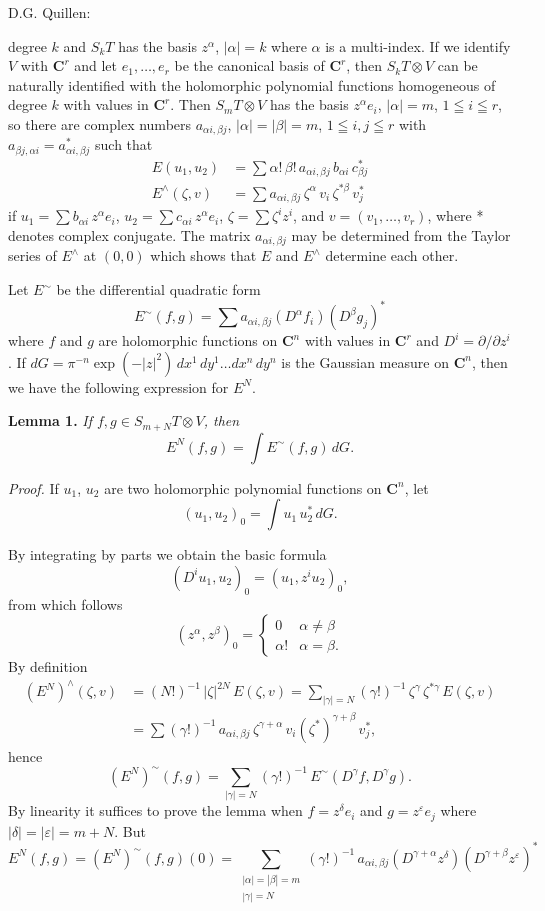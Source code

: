  \hfill D.G. Quillen:

degree $k$ and $S_k T$ has the basis $z^\alpha$, $|\alpha|=k$ where $\alpha$ is a multi-index. If we
identify $V$ with $\mathbf{C}^r$ and let $e_1,\dots,e_r$ be the canonical basis of $\mathbf{C}^r$, then
$S_k T\otimes V$ can be naturally identified with the holomorphic polynomial
functions homogeneous of degree $k$ with values in $\mathbf{C}^r$. Then $S_m T\otimes V$
has the basis $z^\alpha e_i$, $|\alpha|=m$, $1\leqq i\leqq r$, so there are complex numbers $a_{\alpha i,\beta j}$,
$|\alpha|=|\beta|=m$, $1\leqq i, j\leqq r$ with $a_{\beta j,\alpha i}=a^*_{\alpha i,\beta j}$ such that
\[
\begin{aligned}
E(u_1,u_2)&=\sum \alpha!\,\beta!\,a_{\alpha i,\beta j}\,b_{\alpha i}\,c^*_{\beta j}\\
E^\wedge(\zeta,v)&=\sum a_{\alpha i,\beta j}\,\zeta^\alpha\,v_i\,\zeta^{*\beta}\,v^*_j
\end{aligned}
\tag{2}
\]
if $u_1=\sum b_{\alpha i}\,z^\alpha e_i$, $u_2=\sum c_{\alpha i}\,z^\alpha e_i$, $\zeta=\sum \zeta^i z^i$, and $v=(v_1,\dots,v_r)$, where *
denotes complex conjugate. The matrix $a_{\alpha i,\beta j}$ may be determined from
the Taylor series of $E^\wedge$ at $(0,0)$ which shows that $E$ and $E^\wedge$ determine
each other.

Let $E^\sim$ be the differential quadratic form
\[
E^\sim(f,g)=\sum a_{\alpha i,\beta j}(D^\alpha f_i)(D^\beta g_j)^*
\]
where $f$ and $g$ are holomorphic functions on $\mathbf{C}^n$ with values in $\mathbf{C}^r$ and
$D^i=\partial/\partial z^i$. If $dG=\pi^{-n}\exp(-|z|^2)\,dx^1\,dy^1\dots dx^n\,dy^n$ is the Gaussian
measure on $\mathbf{C}^n$, then we have the following expression for $E^N$.

\textbf{Lemma 1.} \textit{If $f,g\in S_{m+N}T\otimes V$, then}
\[
E^N(f,g)=\int E^\sim(f,g)\,dG.
\]

\textit{Proof.} If $u_1$, $u_2$ are two holomorphic polynomial functions on $\mathbf{C}^n$, let
\[
(u_1,u_2)_0=\int u_1\,u_2^*\,dG.
\]

By integrating by parts we obtain the basic formula
\[
(D^i u_1,u_2)_0=(u_1,z^i u_2)_0,
\]
from which follows
\[
(z^\alpha,z^\beta)_0=\begin{cases}0 & \alpha\neq\beta\\ \alpha! & \alpha=\beta.\end{cases}
\tag{3}
\]
By definition
\[
\begin{aligned}
(E^N)^\wedge(\zeta,v)&=(N!)^{-1}\,|\zeta|^{2N}\,E(\zeta,v)=\sum_{|\gamma|=N}(\gamma!)^{-1}\,\zeta^\gamma\,\zeta^{*\gamma}\,E(\zeta,v)\\
&=\sum(\gamma!)^{-1}\,a_{\alpha i,\beta j}\,\zeta^{\gamma+\alpha}\,v_i(\zeta^*)^{\gamma+\beta}\,v_j^*,
\end{aligned}
\]
hence
\[
(E^N)^\sim(f,g)=\sum_{|\gamma|=N}(\gamma!)^{-1}\,E^\sim(D^\gamma f,D^\gamma g).
\]
By linearity it suffices to prove the lemma when $f=z^\delta e_i$ and $g=z^\varepsilon e_j$
where $|\delta|=|\varepsilon|=m+N$. But
\[
E^N(f,g)=(E^N)^\sim(f,g)(0)=\sum_{\substack{|\alpha|=|\beta|=m\\ |\gamma|=N}}(\gamma!)^{-1}\,a_{\alpha i,\beta j}(D^{\gamma+\alpha}z^\delta)(D^{\gamma+\beta}z^\varepsilon)^*
\]

